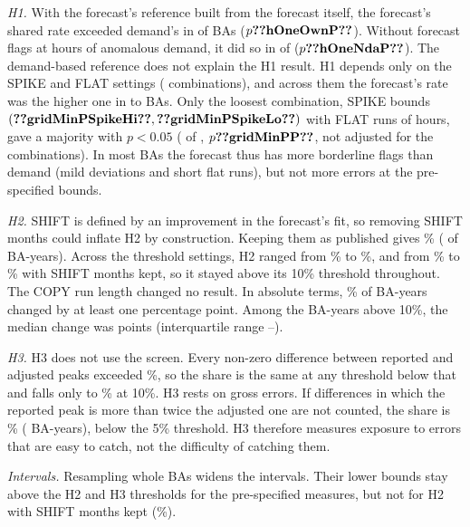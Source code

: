 \documentclass[conference,a4paper]{IEEEtran}
\begin{document}
\emph{H1.} With the forecast's reference built from the forecast itself, the forecast's shared rate exceeded demand's in  of  BAs ($p\res{hOneOwnP}$). Without forecast flags at hours of anomalous demand, it did so in  of  ($p\res{hOneNdaP}$). The demand-based reference does not explain the H1 result. H1 depends only on the SPIKE and FLAT settings ( combinations), and across them the forecast's rate was the higher one in  to  BAs. Only the loosest combination, SPIKE bounds $(\res{gridMinPSpikeHi}, \res{gridMinPSpikeLo})$ with FLAT runs of  hours, gave a majority with $p<0.05$ ( of , $p\res{gridMinPP}$, not adjusted for the  combinations). In most BAs the forecast thus has more borderline flags than demand (mild deviations and short flat runs), but not more errors at the pre-specified bounds.

\emph{H2.} SHIFT is defined by an improvement in the forecast's fit, so removing SHIFT months could inflate H2 by construction. Keeping them as published gives \% ( of  BA-years). Across the  threshold settings, H2 ranged from \% to \%, and from \% to \% with SHIFT months kept, so it stayed above its 10\% threshold throughout. The COPY run length changed no result. In absolute terms, \% of BA-years changed by at least one percentage point. Among the  BA-years above 10\%, the median change was  points (interquartile range --).

\emph{H3.} H3 does not use the screen. Every non-zero difference between reported and adjusted peaks exceeded \%, so the share is the same at any threshold below that and falls only to \% at 10\%. H3 rests on gross errors. If differences in which the reported peak is more than twice the adjusted one are not counted, the share is \% ( BA-years), below the 5\% threshold. H3 therefore measures exposure to errors that are easy to catch, not the difficulty of catching them.

\emph{Intervals.} Resampling whole BAs widens the intervals. Their lower bounds stay above the H2 and H3 thresholds for the pre-specified measures, but not for H2 with SHIFT months kept (\%).
\end{document}
